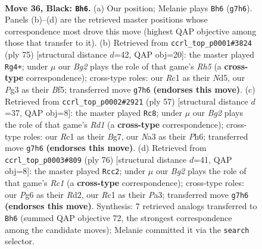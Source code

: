 \documentclass[11pt]{article}
\begin{document}
\clearpage

\begin{figure}[p]\centering
\begin{subfigure}{0.46\textwidth}\centering
\resizebox{\linewidth}{!}{%
\newchessgame
\chessboard[
  setfen={Q7/6b1/1p3kp1/2pB4/7P/n5pK/3NR3/2r5 b - - 1 36},
  showmover=false,
  pgfstyle=straightmove, color=movearrow, markmove={g7-h6}
]}
\caption{}
\end{subfigure}\hfill
\begin{subfigure}{0.46\textwidth}\centering
\resizebox{\linewidth}{!}{%
\newchessgame
\chessboard[
  setfen={8/5p1k/N5p1/3n1b2/7r/Q1p5/P7/5RK1 b - - 4 38},
  showmover=false,
  pgfstyle=straightmove, color=movearrow, markmove={h4-g4}
]}
\caption{}
\end{subfigure}
\\[4pt]
\begin{subfigure}{0.46\textwidth}\centering
\resizebox{\linewidth}{!}{%
\newchessgame
\chessboard[
  setfen={3r2k1/5pb1/6pp/1R6/6P1/4B3/5P1P/5K2 b - - 1 29},
  showmover=false,
  pgfstyle=straightmove, color=movearrow, markmove={d8-c8}
]}
\caption{}
\end{subfigure}\hfill
\begin{subfigure}{0.46\textwidth}\centering
\resizebox{\linewidth}{!}{%
\newchessgame
\chessboard[
  setfen={7k/6p1/1N2b2p/4r3/5r2/P6P/3R2PK/2R5 w - - 2 39},
  showmover=false,
  pgfstyle=straightmove, color=movearrow, markmove={c1-c2}
]}
\caption{}
\end{subfigure}
\caption{\textbf{Move 36, Black: \texttt{Bh6}.} (a) Our position; Melanie plays \texttt{Bh6} (\texttt{g7h6}). Panels (b)--(d) are the retrieved master positions whose correspondence most drove this move (highest QAP objective among those that transfer to it). (b) Retrieved from \texttt{ccrl\_top\_p0001\#3824} (ply 75) [structural distance $d$=42, QAP obj=20]: the master played \texttt{Rg4+}; under $\mu$ our \emph{Bg2} plays the role of that game's \emph{Rh5} (a \textbf{cross-type} correspondence); cross-type roles: our \emph{R}c1 as their \emph{N}d5, our \emph{P}g3 as their \emph{B}f5; transferred move \texttt{g7h6} \textbf{(endorses this move)}. (c) Retrieved from \texttt{ccrl\_top\_p0002\#2921} (ply 57) [structural distance $d$=37, QAP obj=8]: the master played \texttt{Rc8}; under $\mu$ our \emph{Bg2} plays the role of that game's \emph{Rd1} (a \textbf{cross-type} correspondence); cross-type roles: our \emph{R}c1 as their \emph{B}g7, our \emph{N}a3 as their \emph{P}h6; transferred move \texttt{g7h6} \textbf{(endorses this move)}. (d) Retrieved from \texttt{ccrl\_top\_p0003\#809} (ply 76) [structural distance $d$=41, QAP obj=8]: the master played \texttt{Rcc2}; under $\mu$ our \emph{Bg2} plays the role of that game's \emph{Rc1} (a \textbf{cross-type} correspondence); cross-type roles: our \emph{P}g6 as their \emph{R}d2, our \emph{R}c1 as their \emph{P}a3; transferred move \texttt{g7h6} \textbf{(endorses this move)}. Synthesis: 7 retrieved analogs transferred to \texttt{Bh6} (summed QAP objective 72, the strongest correspondence among the candidate moves); Melanie committed it via the \texttt{search} selector.}
\label{fig:thought-m71}
\end{figure}
\end{document}
